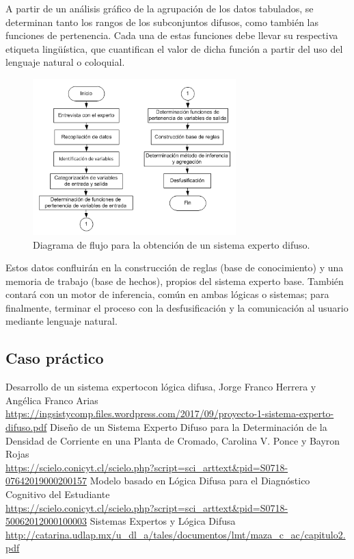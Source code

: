 \documentclass[a4paper, 11pt, titlepage]{article}
\begin{document}
    A partir de un análisis gráfico de la agrupación de los datos tabulados, se determinan tanto los 
    rangos de los subconjuntos difusos, como también las funciones de pertenencia. Cada una de 
    estas funciones debe llevar su respectiva etiqueta lingüística, que cuantifican el valor de dicha 
    función a partir del uso del lenguaje natural o coloquial. 

    \begin{figure}[htp]
        \centering
        \includegraphics[width=0.7\textwidth]{resources/diagramaflujoexperto.png}
        \caption{Diagrama de flujo para la obtención de un sistema experto difuso.}
        \label{diagramaflujoexperto}
    \end{figure}

    Estos datos confluirán en la construcción de reglas (base de conocimiento) y una memoria de trabajo 
    (base de hechos), propios del sistema experto base. También contará con un motor de inferencia, común 
    en ambas lógicas o sistemas; para finalmente, terminar el proceso con la desfusificación y la comunicación 
    al usuario mediante lenguaje natural.
    
    \subsection{Caso práctico}


\newpage
\begin{thebibliography}{X}
    \bibitem{} Desarrollo de un sistema expertocon lógica difusa, Jorge Franco Herrera y Angélica Franco Arias \\ \url{https://ingsistycomp.files.wordpress.com/2017/09/proyecto-1-sistema-experto-difuso.pdf}
    \bibitem{} Diseño de un Sistema Experto Difuso para la Determinación de la Densidad de Corriente en una Planta de Cromado, Carolina V. Ponce y Bayron Rojas \\ \url{https://scielo.conicyt.cl/scielo.php?script=sci_arttext&pid=S0718-07642019000200157}
    \bibitem{} Modelo basado en Lógica Difusa para el Diagnóstico Cognitivo del Estudiante \\ \url{https://scielo.conicyt.cl/scielo.php?script=sci_arttext&pid=S0718-50062012000100003}
    \bibitem{} Sistemas Expertos y Lógica Difusa \\ \url{http://catarina.udlap.mx/u_dl_a/tales/documentos/lmt/maza_c_ac/capitulo2.pdf}
\end{thebibliography}
\end{document}
